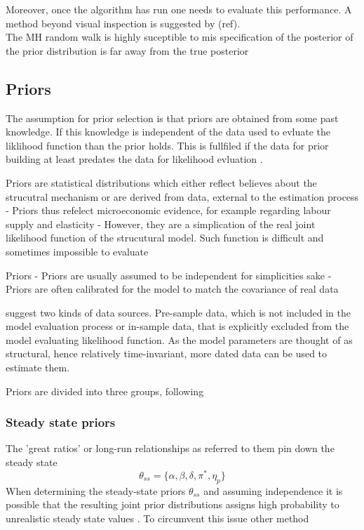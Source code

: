 \documentclass[11pt,a4paper,english]{article} %
\begin{document}
	Moreover, once the algorithm has run one needs to evaluate this performance. A method beyond visual inspection is suggested by (ref).\\
	
	
	The MH random walk is highly suceptible to mis specification of the posterior of the prior distribution is far away from the true posterior \cite{herbst_bayesian_2014}
	
	
	
	
	
	
	
	
	
	
	
	
	
	\subsection{Priors}
	
	The assumption for prior selection is that priors are obtained from some past knowledge. If this knowledge is independent of the data used to evluate the liklihood function than the prior holds. This is fullfiled if the data for prior building at least predates the data for likelihood evluation \cite{herbst_bayesian_2014}.
	
	
	Priors are statistical distributions which either reflect believes about the strucutral mechanism or are derived from data, external to the estimation process \cite{del_negro_forming_2008}
	- Priors thus refelect microeconomic evidence, for example regarding labour supply and elasticity
	- However, they are a simplication of the real joint likelihood function of the strucutural model. Such function is difficult and sometimes impossible to evaluate
	
	Priors \cite{del_negro_forming_2008}
	- Priors are usually assumed to be independent for simplicities sake
	- Priors are often calibrated for the model to match the covariance of real data
		
	\cite{del_negro_forming_2008} suggest two kinds of data sources. Pre-sample data, which is not included in the model evaluation process or in-sample data, that is explicitly excluded from the model evaluating likelihood function.
	As the model parameters are thought of as structural, hence relatively time-invariant, more dated data can be used to estimate them. 
	
	Priors are divided into three groups, following \cite{del_negro_forming_2008}
	
	\subsubsection{Steady state priors}
	The 'great ratios' or long-run relationships as \cite{kydland_time_1982} referred to them pin down the steady state
	\[
		\theta_{ss} = \{\alpha, \beta, \delta, \pi^*, \eta_p\} %
	\]
	When determining the steady-state priors $\theta_{ss}$ and assuming independence it is possible that the resulting joint prior distributions assigns high probability to unrealistic steady state values \cite{del_negro_forming_2008}. To circumvent this issue other method
	
\end{document}
